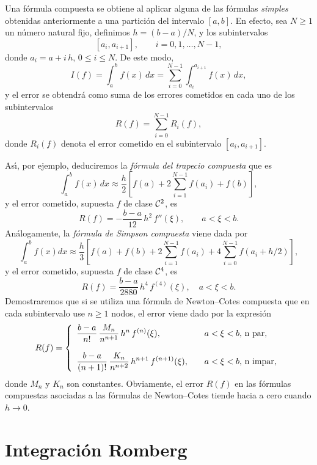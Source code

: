 Una f\'ormula compuesta se obtiene al aplicar alguna de las f\'ormulas {\it simples}
obtenidas anteriormente a una par\-ti\-ci\'on del intervalo
$[a,b]$. En efecto, sea $N\ge 1$ un n\'umero natural fijo, definimos $h=(b-a)/N$, y los subintervalos
$$[a_i,a_{i+1}], \qquad i=0, 1, \ldots, N-1,$$
donde $a_i = a + i\,h, \, 0\le i \le N$. De este modo, 
$$I(f) = \int_a^b f(x)\, dx = \sum_{i=0}^{N-1}\int_{a_i}^{a_{i+1}} f(x) \,dx,$$
y el error se obtendr\'a como suma de los errores cometidos en cada uno de los 
subintervalos
$$R(f) = \sum_{i=0}^{N-1} R_i(f),$$
donde $R_i(f)$ denota el error cometido en el subintervalo $[a_i,a_{i+1}]$.

As\'\i , por ejemplo, deduciremos la {\it f\'ormula del trapecio compuesta\/} que es
$$
  \int_a^b\!\! f(x)\,dx \approx
  \frac{h}{2}\left[f(a) + 2\!\!\sum_{i=1}^{N-1} f(a_i) + f(b) \right],
$$
y el error cometido, supuesta $f$ de clase ${\cal C}^2$, es
$$
  R(f) = - \frac{b-a}{12} \, h^2 \, f''(\xi),\qquad a<\xi<b.
$$
An\'alogamente, la {\it f\'ormula de Simpson compuesta\/} viene dada por
$$
  \int_a^b\!\! f(x)dx \approx
  \frac{h}{3}\left[f(a) + f(b) + 2\!\sum_{i=1}^{N-1} f(a_i)
              + 4\!\sum_{i=0}^{N-1} f(a_{i} +h/2) \right],
$$
y el error cometido, supuesta $f$ de clase ${\cal C}^4$,
es
$$
  R(f) =\frac{b-a}{2880}\,h^4\,f^{(4)}(\xi),\quad a<\xi<b.
$$
Demostraremos que si se utiliza una f\'ormula de Newton--Cotes compuesta que en
cada subintervalo use $n\ge1$ nodos, el error viene dado por la expresi\'on
$$
R(f)=\left\{\begin{array}{ll}
                  \displaystyle
                  \frac{b-a}{n!}\,\frac{M_n}{n^{n+1}}\,h^n\,f^{(n)}(\xi),
                                                 & \quad a<\xi<b\hbox{,  n par,} \\*
                                 &  \\*
                  \displaystyle
                  \frac{b-a}{(n+1)!}\,\frac{K_n}{n^{n+2}}\,h^{n+1}\,f^{(n+1)}(\xi),
                                                 & \quad a<\xi<b\hbox{,  n impar,}
             \end{array}
       \right.
$$
donde $M_n$ y $K_n$ son constantes.
Obviamente, el error $R(f)$ en las f\'ormulas compuestas asociadas a las f\'ormulas de Newton--Cotes tiende hacia a cero cuando $h \rightarrow 0$.



\section{Integración Romberg}

